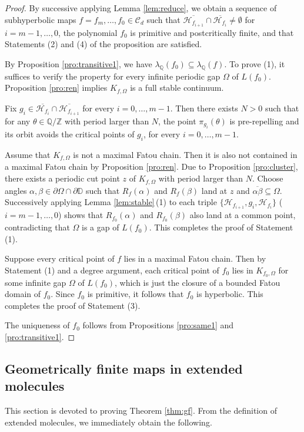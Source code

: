 \documentclass[a4paper,reqno,times, 11pt]{amsart}
\theoremstyle{remark}
\theoremstyle{plain}
\numberwithin{equation}{section}
\def\HHHH{\mathscr H}
\def\CCCC{\mathscr C}
\def\D{\mathbb D}
\def\Q{\mathbb Q}
\def\Z{\mbox{$\mathbb Z$}}
\begin{document}
\begin{proof}
	By successive applying Lemma \ref{lem:reduce}, we obtain a sequence of subhyperbolic maps $f=f_m,\ldots, f_0\in\CCCC_d$ such that $\overline{\HHHH_{f_{i+1}}}\cap \overline{\HHHH_{f_i}}\not=\emptyset$ for $i=m-1,\ldots,0$, the polynomial $f_0$ is primitive and postcritically finite, and that Statements (2) and (4) of the proposition are satisfied.
	
	
	
	By Proposition \ref{pro:transitive1}, we have $\lambda_\Q(f_0) \subseteq \lambda_\Q(f)$. To prove (1), it suffices to verify the property for every infinite periodic gap $\Omega$ of $L(f_0)$. Proposition \ref{pro:ren} implies $K_{f,\Omega}$ is a full stable continuum.
		
	Fix  $g_i\in \overline{\HHHH_{f_i}}\cap\overline{\HHHH_{f_{i+1}}}$ for every $i=0,\ldots,m-1$. Then there exists $N>0$ such that for any $\theta\in\Q/\Z$ with period larger than $N$, the point $\pi_{g_i}(\theta)$ is pre-repelling and its orbit avoids the critical points of $g_i$, for every $i=0,\ldots,m-1$.
	
	
	Assume that $K_{f,\Omega}$ is not a maximal Fatou chain. Then it is also not contained in a maximal Fatou chain by Proposition \ref{pro:ren}.  Due to Proposition \ref{pro:cluster}, there exists a periodic cut point $z$ of $K_{f,\Omega}$ with period larger than $N$. Choose angles $\alpha,\beta\in\partial\Omega\cap\partial\D$ such that $R_f(\alpha)$ and $R_f(\beta)$ land at $z$ and $\overline{\alpha\beta}\subseteq\Omega$.  Successively applying Lemma \ref{lem:stable}\,(1) to each triple $\{\HHHH_{f_{i+1}},g_i,\HHHH_{f_i}\}$ ($i=m-1,\ldots,0$) shows that
	$R_{f_0}(\alpha)$ and $R_{f_0}(\beta)$ also land at a common point, contradicting that $\Omega$ is a gap of $L(f_0)$. This completes the proof of Statement (1).
	
	Suppose every critical point of $f$ lies in a maximal Fatou chain. Then by Statement (1) and a degree argument,  each critical point of $f_0$ lies in $K_{f_0,\Omega}$ for some infinite gap $\Omega$ of $L(f_0)$, which is just the closure of a bounded Fatou domain of $f_0$. Since $f_0$ is primitive, it follows that  $f_0$ is hyperbolic. This completes the proof of Statement (3).
	
	The uniqueness of $f_0$ follows from  Propositions \ref{pro:same1} and \ref{pro:transitive1}.
\end{proof}

\subsection{Geometrically finite maps in extended molecules}
This section is devoted to proving Theorem \ref{thm:gf}.
From the definition of extended molecules, we immediately obtain the following.
	
\end{document}
